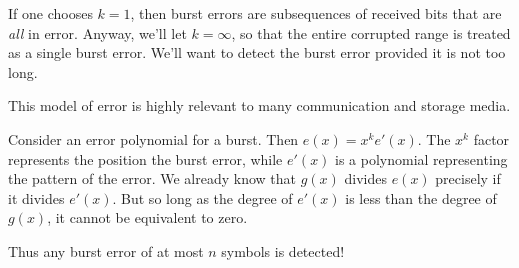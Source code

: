 \documentclass[11pt, oneside]{amsart}
\begin{document}
If one chooses $k=1$, then burst errors are subsequences of received
bits that are \emph{all} in error. Anyway, we'll let $k = \infty$, so
that the entire corrupted range is treated as a single burst error.
We'll want to detect the burst error provided it is not too long.

This model of error is highly relevant to many communication and storage
media.

Consider an error polynomial for a burst. Then $e(x) = x^k e'(x)$. The
$x^k$ factor represents the position the burst error, while $e'(x)$ is a
polynomial representing the pattern of the error. We already know that
$g(x)$ divides $e(x)$ precisely if it divides $e'(x)$. But so long as
the degree of $e'(x)$ is less than the degree of $g(x)$, it cannot be
equivalent to zero.

Thus any burst error of at most $n$ symbols is detected!









\end{document}
